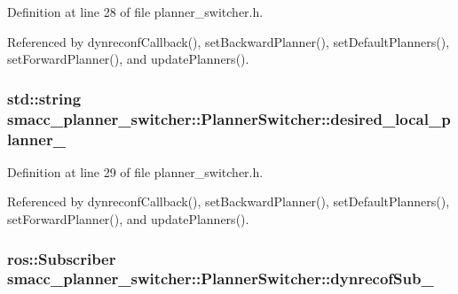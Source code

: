 Definition at line 28 of file planner\+\_\+switcher.\+h.



Referenced by dynreconf\+Callback(), set\+Backward\+Planner(), set\+Default\+Planners(), set\+Forward\+Planner(), and update\+Planners().

\subsubsection[{\texorpdfstring{desired\+\_\+local\+\_\+planner\+\_\+}{desired_local_planner_}}]{\setlength{\rightskip}{0pt plus 5cm}std\+::string smacc\+\_\+planner\+\_\+switcher\+::\+Planner\+Switcher\+::desired\+\_\+local\+\_\+planner\+\_\+\hspace{0.3cm}{\ttfamily [private]}}\hypertarget{classsmacc__planner__switcher_1_1PlannerSwitcher_aecc5958653ed39dd7611783043d23345}{}\label{classsmacc__planner__switcher_1_1PlannerSwitcher_aecc5958653ed39dd7611783043d23345}


Definition at line 29 of file planner\+\_\+switcher.\+h.



Referenced by dynreconf\+Callback(), set\+Backward\+Planner(), set\+Default\+Planners(), set\+Forward\+Planner(), and update\+Planners().

\subsubsection[{\texorpdfstring{dynrecof\+Sub\+\_\+}{dynrecofSub_}}]{\setlength{\rightskip}{0pt plus 5cm}ros\+::\+Subscriber smacc\+\_\+planner\+\_\+switcher\+::\+Planner\+Switcher\+::dynrecof\+Sub\+\_\+\hspace{0.3cm}{\ttfamily [private]}}\hypertarget{classsmacc__planner__switcher_1_1PlannerSwitcher_a3ac34789d0fc620bb2bd27f984486ba9}{}\label{classsmacc__planner__switcher_1_1PlannerSwitcher_a3ac34789d0fc620bb2bd27f984486ba9}


